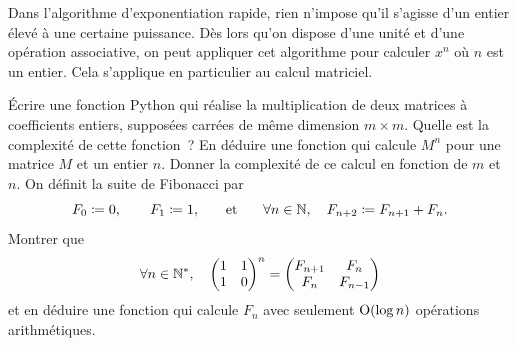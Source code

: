 \documentclass{magnoliaold}
\begin{document}
Dans l'algorithme d'exponentiation rapide, rien n'impose qu'il
s'agisse d'un entier élevé à une certaine puissance. Dès lors qu'on
dispose d'une unité et d'une opération associative, on peut appliquer
cet algorithme pour calculer $x^n$ où $n$ est un entier. Cela
s'applique en particulier au calcul matriciel.
\begin{questions}
\question Écrire une fonction Python qui réalise la multiplication
  de deux matrices à coefficients entiers, supposées carrées de
  même dimension $m\times m$. Quelle est la complexité de cette
  fonction~?
\question En déduire une fonction qui calcule $M^n$ pour une matrice
  $M$ et un entier $n$. Donner la complexité de ce calcul en fonction
  de $m$ et $n$.
\question On définit la suite de Fibonacci par
  \[F_0\coloneqq 0,\qquad F_1\coloneqq   1,\quad\quad\!\text{et}\quad\!\quad
    \forall n\in\mathbb{N},\quad F_{n+2}\coloneqq F_{n+1}+F_n.\]
  Montrer que
  \[\forall n\in{\mathbb{N}^*},\quad
    \begin{pmatrix}
      1 & 1\\
      1 & 0
    \end{pmatrix}^n =
    \begin{pmatrix}
      F_{n+1} & F_n\\
      F_n & F_{n-1}
    \end{pmatrix}\]
    et en déduire une fonction qui calcule $F_n$ avec seulement
    ${\rm O}(\log n)$ opérations arithmétiques.
\end{questions}
\end{document}
